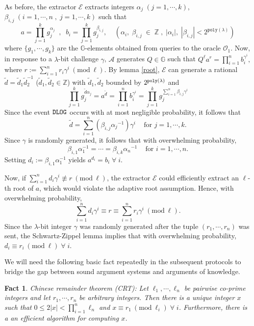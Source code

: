 \documentclass[11pt, lettersize, notitlepage, leqno, footskip=0.6cm]{article}
\newcommand{\bz}{\mathbb Z}
\newcommand{\pl}{\prod\limits}
\newcommand{\slim}{\sum\limits}
\newcommand{\ttt}{\texttt}
\newcommand{\bG}{\mathbb{G}}
\newcommand{\wti}{\widetilde}
\newcommand{\mc}{\mathcal}
\newcommand{\al}{\alpha}
\newcommand{\be}{\beta}
\newcommand{\lam}{\lambda}
\newcommand{\vs}{\vspace{-0.15cm}}
\newcommand{\noin}{\noindent}
\newcommand{\op}{overwhelming probability}
\newcommand{\np}{negligible probability}
\newcommand{\Mod}[1]{\ (\mathrm{mod}\ #1)}
\newcommand{\E}{\mc{E}}
\newtheorem{Fact}{Fact}[section]
\numberwithin{equation}{section}
\begin{document}
\begin{prf} As before, the extractor $\E$ extracts integers $\al_j\;(j=1,\cdots,k)$, $\be_{i,j}\;(i=1,\cdots, n\;,\;j= 1,\cdots,k)$ such that \vs $$a = \pl_{j=1}^k g_j^{\al_j}\;\;,\;\; b_i = \pl_{j=1}^k g_j^{\be_{i,j}},\;\;\;\;(\al_i,\;\be_{i,j}\;\in\;\bz\;,\;|\al_i|,\;|\be_{i,j}| < 2^{\ttt{poly}(\lam)})$$ where $\{g_1,\cdots,g_k\}$ are the $\bG$-elements obtained from queries to the oracle $\mc{O}_1$. Now, in response to a $\lam$-bit challenge $\gamma$, $\mc{A}$ generates $Q\in\bG$ such that $Q^{\ell}a^r = \pl_{i=1}^n b_i^{\gamma^i}, $ where $r:= \slim_{i=1}^n r_i{\gamma}^i\Mod{\ell}$. By lemma \ref{root}, $\E$ can generate a rational $\wti{d} = \wti{d}_1\wti{d}_2^{-1}$ ($\wti{d}_1, \wti{d}_2\in\bz$) with $\wti{d}_1, \wti{d}_2$ bounded by $2^{\tt{poly}(\lam)}$ and \vs $$\pl_{j=1}^k g_j^{\wti{d}\al_j} = a^{\wti{d}} = \pl_{i=1}^n b_i^{\gamma^i} = \pl_{j=1}^k g_j^{\slim_{i=1}^n \be_{i,j}\gamma^i}$$ Since the event \hyperlink{DLOG}{$\tt{DLOG}$} occurs with at most \np, it follows that \vs $$ \wti{d} = \slim_{i=1}^n ({\be_{i,j}}{\al_j}^{-1})\gamma^i\;\;\;\text{ for } j = 1,\cdots, k.$$ Since $\gamma$ is randomly generated, it follows that with \op, \vs $$\be_{i,1}\al_{1}^{-1} = \cdots =  \be_{i,k}{\al_{n}}^{-1}\;\;\;\text{ for } i = 1,\cdots, n.$$ Setting $d_i:= \be_{i,1}\al_{1}^{-1}$ yields $a^{d_i} = b_i\;\forall\; i$.

Now, if $\slim_{i=1}^n d_i\gamma^i \not\equiv r\Mod{\ell}$, the extractor $\E$ could efficiently extract an $\ell$-th root of $a$, which would violate the adaptive root assumption. Hence, with \op, \vs $$\slim_{i=1}^n d_i\gamma^i \equiv r\equiv \slim_{i=1}^n r_i\gamma^i \Mod{\ell}.$$ Since the $\lam$-bit integer $\gamma$ was randomly generated after the tuple $(r_1,\cdots,r_n)$ was sent, the Schwartz-Zippel lemma implies that with \op, $d_i\equiv r_i\Mod{\ell}\;\forall\; i$.\end{prf}

\noin We will need the following basic fact repeatedly in the subsequent protocols to bridge the gap between sound argument systems and arguments of knowledge.\vspace{0.1cm}

\begin{Fact}{\normalfont Chinese remainder theorem (CRT):} Let $\ell_1,\cdots,\ell_n$ be pairwise co-prime integers and let $r_1,\cdots,r_n$ be arbitrary integers. Then there is a unique integer $x$ such that $0\leq 2|x|< \prod_{i=1}^n \ell_n$ and $x\equiv r_1\Mod{\ell_i}\;\forall\;i$. Furthermore, there is a an efficient algorithm for computing $x$. \end{Fact}
\end{document}
